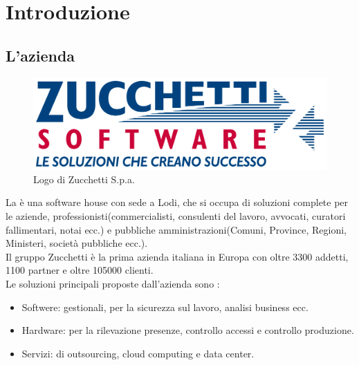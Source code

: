 
\chapter{Introduzione}
\label{cap:introduzione}

\section{L'azienda}

\begin{figure}[htp]
\centering
\includegraphics[width=\textwidth/2]{../immagini/logo_zucchetti}
\caption{Logo di Zucchetti S.p.a.}
\end{figure}

La \myCompany è una software house con sede a Lodi, che si occupa di soluzioni complete per le aziende, professionisti(commercialisti, consulenti del lavoro, avvocati, curatori fallimentari, notai ecc.) e pubbliche amministrazioni(Comuni, Province, Regioni, Ministeri, società pubbliche ecc.).\\
Il gruppo Zucchetti è la prima azienda italiana in Europa con oltre 3300 addetti, 1100 partner e oltre 105000 clienti.\\
Le soluzioni principali proposte dall'azienda sono :\\
\begin{itemize}
\item Softwere: gestionali, per la sicurezza sul lavoro, analisi business ecc.
\item Hardware: per la rilevazione presenze, controllo accessi e controllo produzione.
\item Servizi: di outsourcing, cloud computing e data center.
\end{itemize}

